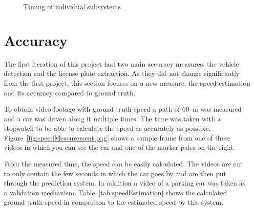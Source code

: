 \begin{figure}
    \centering
    \caption{Timing of individual subsystems}
    \label{fig:timing}
\end{figure}



\section{Accuracy}

The first iteration of this project had two main accuracy measures: the vehicle detection and the license plate extraction.
As they did not change significantly from the first project, this section focuses on a new measure: the speed estimation and its accuracy compared to ground truth.

To obtain video footage with ground truth speed a path of \SI{60}{\metre} was measured and a car was driven along it multiple times.
The time was taken with a stopwatch to be able to calculate the speed as accurately as possible.
Figure~\ref{fig:speedMeasurement.png} shows a sample frame from one of these videos in which you can see the car and one of the marker pales on the right.


From the measured time, the speed can be easily calculated.
The videos are cut to only contain the few seconds in which the car goes by and are then put through the prediction system.
In addition a video of a parking car was taken as a validation mechanism.
Table~\ref{tab:speedEstimation} shows the calculated ground truth speed in comparison to the estimated speed by this system.

